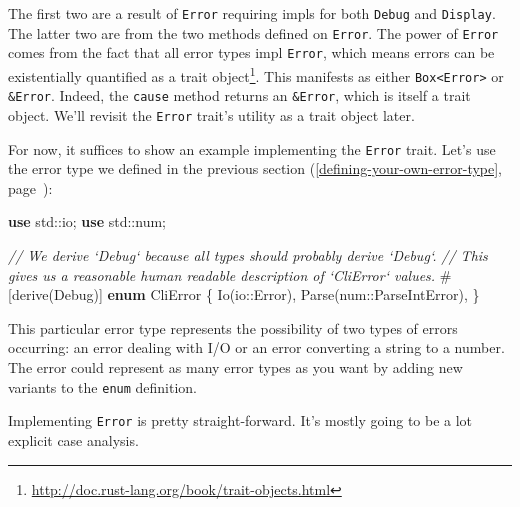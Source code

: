 \documentclass[a4paper,]{book}
\renewcommand*{\hyperlink}[2]{%
 #2 (\autoref{#1}, page~\pageref{#1})}
\newenvironment{Shaded}{\begin{snugshade}}{\end{snugshade}}
\newcommand{\KeywordTok}[1]{\textcolor[rgb]{0.13,0.29,0.53}{\textbf{{#1}}}}
\newcommand{\CommentTok}[1]{\textcolor[rgb]{0.56,0.35,0.01}{\textit{{#1}}}}
\newcommand{\BuiltInTok}[1]{{#1}}
\newcommand{\AttributeTok}[1]{\textcolor[rgb]{0.77,0.63,0.00}{{#1}}}
\newcommand{\NormalTok}[1]{{#1}}
\renewcommand{\href}[2]{#2\footnote{\url{#1}}}
\begin{document}
The first two are a result of \texttt{Error} requiring impls for both
\texttt{Debug} and \texttt{Display}. The latter two are from the two
methods defined on \texttt{Error}. The power of \texttt{Error} comes
from the fact that all error types impl \texttt{Error}, which means
errors can be existentially quantified as a
\href{http://doc.rust-lang.org/book/trait-objects.html}{trait object}.
This manifests as either \texttt{Box\textless{}Error\textgreater{}} or
\texttt{\&Error}. Indeed, the \texttt{cause} method returns an
\texttt{\&Error}, which is itself a trait object. We'll revisit the
\texttt{Error} trait's utility as a trait object later.

For now, it suffices to show an example implementing the \texttt{Error}
trait. Let's use the error type we defined in the
\protect\hyperlink{defining-your-own-error-type}{previous section}:

\begin{Shaded}
\begin{Highlighting}[]
\KeywordTok{use} \NormalTok{std::io;}
\KeywordTok{use} \NormalTok{std::num;}

\CommentTok{// We derive `Debug` because all types should probably derive `Debug`.}
\CommentTok{// This gives us a reasonable human readable description of `CliError` values.}
\AttributeTok{#[}\NormalTok{derive}\AttributeTok{(}\BuiltInTok{Debug}\AttributeTok{)]}
\KeywordTok{enum} \NormalTok{CliError \{}
    \NormalTok{Io(io::Error),}
    \NormalTok{Parse(num::ParseIntError),}
\NormalTok{\}}
\end{Highlighting}
\end{Shaded}

This particular error type represents the possibility of two types of
errors occurring: an error dealing with I/O or an error converting a
string to a number. The error could represent as many error types as you
want by adding new variants to the \texttt{enum} definition.

Implementing \texttt{Error} is pretty straight-forward. It's mostly
going to be a lot explicit case analysis.
\end{document}
